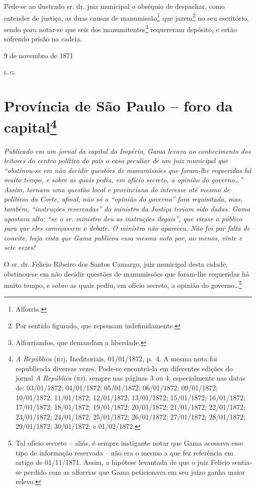 Pede-se ao ilustrado sr. dr. juiz municipal o obséquio de despachar,
como entender de justiça, as duas causas de manumissão\footnote{
  Alforria.} que jazem\footnote{ Por sentido figurado, que repousam
  indefinidamente.} no seu escritório, sendo para notar-se que seis dos
manumitentes\footnote{ Alforriandos, que demandam a liberdade.}
requereram depósito, e estão sofrendo prisão na cadeia.

\begin{flushright}
9 de novembro de 1871

\textsc{l.\,g.}
\end{flushright}

\chapter{Província de São Paulo -- foro da capital\footnote{\emph{A República} (\textsc{rj}), Ineditoriais, 01/01/1872, p.~4.
  A mesma nota foi republicada diversas vezes. Pode-se encontrá-la em
  diferentes edições do jornal \emph{A República} (\textsc{rj}), sempre nas
  páginas 3 ou 4, especialmente nas datas de: 03/01/1872; 04/01/1872;
  05/01/1872; 06/01/1872; 09/01/1872; 10/01/1872; 11/01/1872;
  12/01/1872; 13/01/1872; 15/01/1872; 16/01/1872; 17/01/1872;
  18/01/1872; 19/01/1872; 20/01/1872; 21/01/1872; 22/01/1872;
  23/01/1872; 24/01/1872; 25/01/1872; 26/01/1872; 27/01/1872;
  28/01/1872; 29/01/1872; 30/01/1872; e 01/02/1872.}} %

\begin{didascalia}
\emph{Publicado em um jornal da capital do Império, Gama levava ao
conhecimento dos leitores do centro político do país o caso peculiar de
um juiz municipal que ``obstinou-se em não decidir questões de
manumissões que foram-lhe requeridas há muito tempo, e sobre as quais
pediu, em ofício secreto, a opinião do governo\ldots{}'' Assim, tornava uma
questão local e provinciana do interesse até mesmo de políticos da
Corte, afinal, não só a ``opinião do governo'' fora requisitada, mas,
também, ``instruções reservadas'' do ministro da Justiça teriam sido
dadas. Gama apostava alto: ``se o sr. ministro deu as instruções
ilegais'', que viesse a público para que eles começassem o debate. O
ministro não apareceu. Não foi por falta de convite, haja vista que Gama
publicou essa mesma nota por, ao menos, vinte e sete vezes!}
\end{didascalia}

O sr. dr. Felicio Ribeiro dos Santos Camargo, juiz municipal desta
cidade, obstinou-se em não decidir questões de manumissões que foram-lhe
requeridas há muito tempo, e sobre as quais pediu, em ofício secreto, a
opinião do governo\ldots{}\footnote{ Tal ofício secreto -- aliás, é sempre
  instigante notar que Gama acessava esse tipo de informação reservada
  -- não era o mesmo a que fez referência em artigo de 01/11/1871.
  Assim, a hipótese levantada de que o juiz Felicio sentia-se perdido
  com as alforrias que Gama peticionava em seu juízo ganha maior relevo.}

